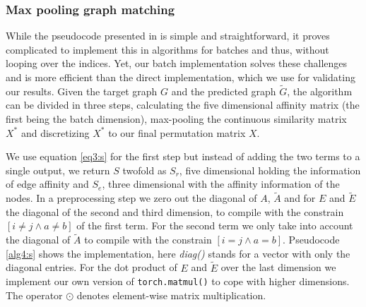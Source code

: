 
\subsubsection{Max pooling graph matching}

While the pseudocode presented in \cite{cho_finding_2014} is simple and straightforward, it proves complicated to implement this in algorithms for batches and thus, without looping over the indices. Yet, our batch implementation solves these challenges and is more efficient than the direct implementation, which we use for validating our results. Given the target graph $G$ and the predicted graph $\tilde{G}$, the algorithm can be divided in three steps, calculating the five dimensional affinity matrix (the first being the batch dimension), max-pooling the continuous similarity matrix $X^*$ and discretizing $X^*$ to our final permutation matrix $X$.

We use equation \ref{eq3:s} for the first step but instead of adding the two terms to a single output, we return $S$ twofold as $S_r$, five dimensional holding the information of edge affinity and $S_e$, three dimensional with the affinity information of the nodes. In a preprocessing step we zero out the diagonal of $A$, $\tilde{A}$ and for $E$ and $\tilde{E}$ the diagonal of the second and third dimension, to compile with the constrain $[i \neq j \wedge a \neq b]$ of the first term. For the second term we only take into account the diagonal of $\tilde{A}$ to compile with the constrain $[i=j \wedge a=b]$. Pseudocode \ref{alg4:s} shows the implementation, here \textit{diag()} stands for a vector with only the diagonal entries. For the dot product of $E$ and $\tilde{E}$ over the last dimension we implement our own version of \texttt{torch.matmul()} to cope with higher dimensions. The operator $\odot$ denotes element-wise matrix multiplication.



